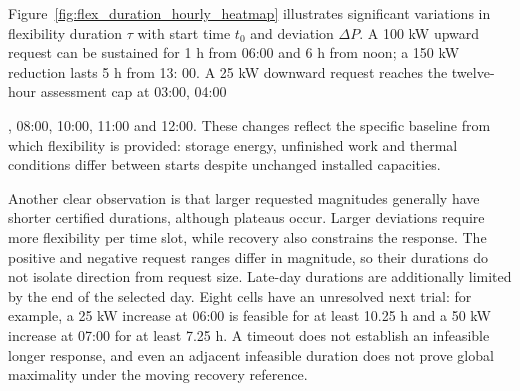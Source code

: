 \documentclass[lettersize,journal]{IEEEtran}
\providecommand{\DIFadd}[1]{{\color{blue}#1}}
\providecommand{\DIFaddbegin}{}
\providecommand{\DIFaddend}{}
\begin{document}
Figure~\ref{fig:flex_duration_hourly_heatmap} illustrates significant variations in flexibility duration $\tau$ with start time $t_0$ and deviation $\Delta P$.  \DIFaddbegin \DIFadd{A 100 kW upward request can be sustained for 1 h from 06}\DIFaddend :00  \DIFaddbegin \DIFadd{and 6 h from noon; a 150 kW reduction lasts 5 h from 13}\DIFaddend : 00.  \DIFaddbegin \DIFadd{A 25 kW downward request reaches the twelve-hour assessment cap at 03}\DIFaddend :\DIFaddbegin \DIFadd{00, 04:}\DIFaddend 00 \DIFaddbegin \DIFadd{, 08:00, 10:00, 11:00 and 12:00. These changes reflect the specific baseline from which flexibility is provided: storage energy, unfinished work and thermal conditions differ between starts despite unchanged installed capacities.

}

\DIFaddend Another clear observation is that  \DIFaddbegin \DIFadd{larger requested magnitudes generally have shorter certified durations, although plateaus occur. Larger deviations require more flexibility per time slot, while recovery also constrains the response. The positive and negative request ranges differ in magnitude, so their durations do not isolate direction from request size. Late-day durations are additionally limited by the end of the selected day. Eight cells have an unresolved next trial: for example, a 25 kW increase at 06:00 is feasible for at least 10.25 h and a 50 kW increase at 07:00 for at least 7.25 h. A timeout does not establish an infeasible longer response, and even an adjacent infeasible duration does not prove global maximality under the moving recovery reference}\DIFaddend .
\end{document}
